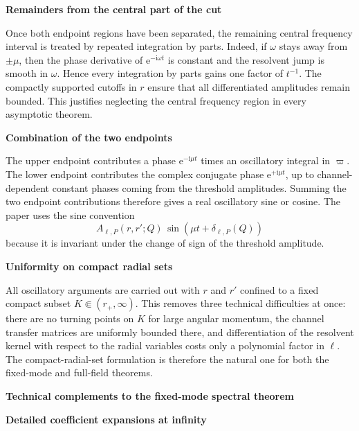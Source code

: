 \documentclass[12pt]{article}
\numberwithin{equation}{section}
\theoremstyle{plain}
\theoremstyle{definition}
\theoremstyle{remark}
\newcommand{\ii}{\mathrm i}
\newcommand{\ee}{\mathrm e}
\newcommand{\om}{\omega}
\newcommand{\vp}{\varpi}
\newcommand{\appheading}[1]{\par\medskip\noindent\textbf{#1}\par\smallskip\noindent}
\newcommand{\applabelheading}[2]{\par\medskip\phantomsection\label{#2}\noindent\textbf{#1}\par\smallskip\noindent}
\begin{document}
\appheading{Remainders from the central part of the cut}

Once both endpoint regions have been separated, the remaining central frequency interval is treated by repeated integration by parts.  Indeed, if $\om$ stays away from $\pm\mu$, then the phase derivative of $\ee^{-\ii\om t}$ is constant and the resolvent jump is smooth in $\om$.  Hence every integration by parts gains one factor of $t^{-1}$.  The compactly supported cutoffs in $r$ ensure that all differentiated amplitudes remain bounded.  This justifies neglecting the central frequency region in every asymptotic theorem.

\appheading{Combination of the two endpoints}

The upper endpoint contributes a phase $\ee^{-\ii\mu t}$ times an oscillatory integral in $\vp$.  The lower endpoint contributes the complex conjugate phase $\ee^{+\ii\mu t}$, up to channel-dependent constant phases coming from the threshold amplitudes.  Summing the two endpoint contributions therefore gives a real oscillatory sine or cosine.  The paper uses the sine convention
\[
   A_{\ell,P}(r,r';Q)\,\sin(\mu t+\delta_{\ell,P}(Q))
\]
because it is invariant under the change of sign of the threshold amplitude.

\appheading{Uniformity on compact radial sets}

All oscillatory arguments are carried out with $r$ and $r'$ confined to a fixed compact subset $K\Subset(r_+,\infty)$.  This removes three technical difficulties at once: there are no turning points on $K$ for large angular momentum, the channel transfer matrices are uniformly bounded there, and differentiation of the resolvent kernel with respect to the radial variables costs only a polynomial factor in $\ell$.  The compact-radial-set formulation is therefore the natural one for both the fixed-mode and full-field theorems.

\applabelheading{Technical complements to the fixed-mode spectral theorem}{app:tech_spectral}
\appheading{Detailed coefficient expansions at infinity}
\end{document}
